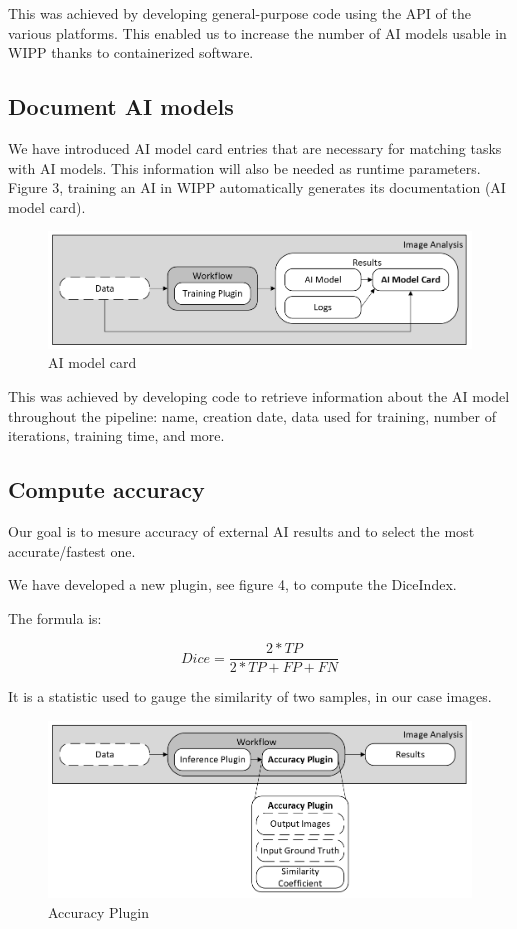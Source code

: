 This was achieved by developing general-purpose code using the API of
the various platforms. This
enabled us to increase the number of AI models usable
in WIPP thanks to containerized software.

\subsection{Document AI models}

We have introduced AI model card entries that are necessary for matching tasks
with AI models. This information will also be needed as runtime parameters.
Figure 3, training an AI in WIPP automatically generates its documentation
(AI model card).

\begin{figure}[H]
  \centering
  \includegraphics[width=1.0\linewidth]{png/methods/ai_model_card.png}
  \caption{AI model card}
  \label{fig:3aimodelcard}
\end{figure}

This was achieved by developing code to retrieve information about the AI model
throughout the pipeline: name, creation date, data used for training, number of
iterations, training time, and more.

\subsection{Compute accuracy}

Our goal is to mesure accuracy of external AI results and to select the most
accurate/fastest one.

We have developed a new plugin, see figure 4, to compute the \Gls{DiceIndex}.

The formula is:

\[ Dice = \frac{2*TP}{2*TP + FP + FN} \]

It is a statistic used to gauge the similarity of two samples, in
our case images.

\begin{figure}[H]
  \centering
  \includegraphics[width=1.0\linewidth]{png/methods/accuracy.png}
  \caption{Accuracy Plugin}
  \label{fig:4accuracy}
\end{figure}

